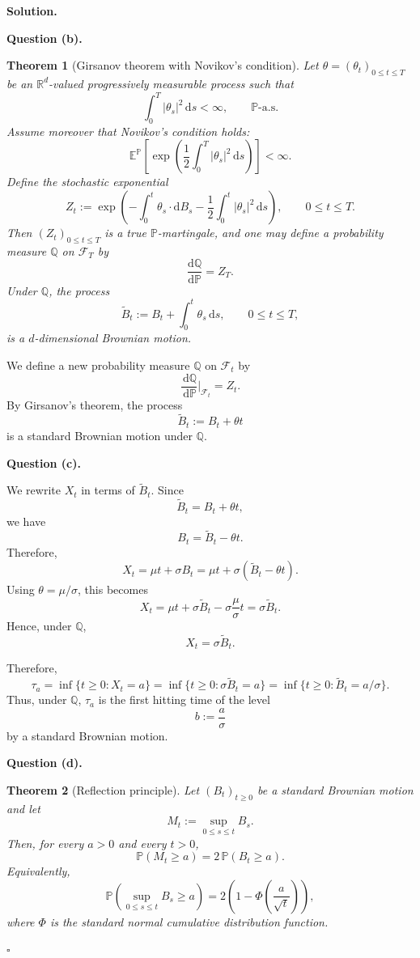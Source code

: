 \documentclass[11pt]{article}
\theoremstyle{plain}
\newtheorem{theorem}{Theorem}[section]
\newcommand{\dd}{\,\mathrm{d}}
\newcommand{\1}{\mathbf{1}}
\theoremstyle{definition}
\newenvironment{solution}
{\par\medskip\noindent\textbf{Solution.}\par\medskip}
{\hfill$\square$\par\medskip}
\newenvironment{solutionpart}[1]
{\par\medskip\noindent\textbf{#1.}\par\smallskip}
{\par\medskip}
\begin{document}
\begin{solution}
\begin{solutionpart}{Question (b)}
\begin{theorem}[Girsanov theorem with Novikov's condition]
Let $\theta=(\theta_t)_{0\le t\le T}$ be an $\mathbb R^d$-valued progressively measurable process such that
\[
\int_0^T |\theta_s|^2\,\mathrm ds<\infty,
\qquad \mathbb P\text{-a.s.}
\]
Assume moreover that Novikov's condition holds:
\[
\mathbb E^{\mathbb P}\left[
\exp\left(
\frac12\int_0^T |\theta_s|^2\,\mathrm ds
\right)
\right]<\infty.
\]
Define the stochastic exponential
\[
Z_t
:=
\exp\left(
-\int_0^t \theta_s\cdot \mathrm dB_s
-\frac12\int_0^t |\theta_s|^2\,\mathrm ds
\right),
\qquad 0\le t\le T.
\]
Then $(Z_t)_{0\le t\le T}$ is a true $\mathbb P$-martingale, and one may define a probability measure $\mathbb Q$ on $\mathcal F_T$ by
\[
\frac{\mathrm d\mathbb Q}{\mathrm d\mathbb P}
=
Z_T.
\]
Under $\mathbb Q$, the process
\[
\widetilde B_t
:=
B_t+\int_0^t \theta_s\,\mathrm ds,
\qquad 0\le t\le T,
\]
is a $d$-dimensional Brownian motion.
\end{theorem}

We define a new probability measure $\mathbb{Q}$ on $\mathcal{F}_t$ by
\[
\frac{\dd\mathbb{Q}}{\dd\mathbb{P}}\Big|_{\mathcal{F}_t}
=
Z_t.
\]
By Girsanov's theorem, the process
\[
\widetilde B_t
:=
B_t+\theta t
\]
is a standard Brownian motion under $\mathbb{Q}$.
\end{solutionpart}

\begin{solutionpart}{Question (c)}
We rewrite $X_t$ in terms of $\widetilde B_t$.
Since
\[
\widetilde B_t=B_t+\theta t,
\]
we have
\[
B_t=\widetilde B_t-\theta t.
\]
Therefore,
\[
X_t
=
\mu t+\sigma B_t
=
\mu t+\sigma(\widetilde B_t-\theta t).
\]
Using $\theta=\mu/\sigma$, this becomes
\[
X_t
=
\mu t+\sigma\widetilde B_t-\sigma\frac{\mu}{\sigma}t
=
\sigma\widetilde B_t.
\]
Hence, under $\mathbb{Q}$,
\[
X_t=\sigma\widetilde B_t.
\]

Therefore,
\[
\tau_a
=
\inf\{t\ge0:X_t=a\}
=
\inf\{t\ge0:\sigma\widetilde B_t=a\}
=
\inf\{t\ge0:\widetilde B_t=a/\sigma\}.
\]
Thus, under $\mathbb{Q}$, $\tau_a$ is the first hitting time of the level
\[
b:=\frac{a}{\sigma}
\]
by a standard Brownian motion.
\end{solutionpart}

\begin{solutionpart}{Question (d)}

\begin{theorem}[Reflection principle]
Let $(B_t)_{t\ge 0}$ be a standard Brownian motion and let
\[
M_t:=\sup_{0\le s\le t} B_s.
\]
Then, for every $a>0$ and every $t>0$,
\[
\mathbb{P}(M_t\ge a)
=
2\,\mathbb{P}(B_t\ge a).
\]
Equivalently,
\[
\mathbb{P}\left(\sup_{0\le s\le t}B_s\ge a\right)
=
2\left(1-\Phi\left(\frac{a}{\sqrt t}\right)\right),
\]
where $\Phi$ is the standard normal cumulative distribution function.
\end{theorem}



\end{solutionpart}
\end{solution}
\end{document}
